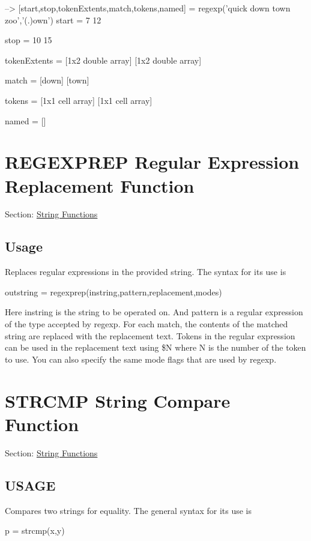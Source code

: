 \begin{DoxyVerbInclude}
--> [start,stop,tokenExtents,match,tokens,named] = regexp('quick down town zoo','(.)own')
start = 
  7 12 

stop = 
 10 15 

tokenExtents = 
 [1x2 double array] [1x2 double array] 

match = 
 [down] [town] 

tokens = 
 [1x1 cell array] [1x1 cell array] 

named = 
  []
\end{DoxyVerbInclude}
 \hypertarget{string_regexprep}{}\section{R\-E\-G\-E\-X\-P\-R\-E\-P Regular Expression Replacement Function}\label{string_regexprep}
Section\-: \hyperlink{sec_string}{String Functions} \hypertarget{vtkwidgets_vtkxyplotwidget_Usage}{}\subsection{Usage}\label{vtkwidgets_vtkxyplotwidget_Usage}
Replaces regular expressions in the provided string. The syntax for its use is \begin{DoxyVerb}  outstring = regexprep(instring,pattern,replacement,modes)
\end{DoxyVerb}
 Here {\ttfamily instring} is the string to be operated on. And {\ttfamily pattern} is a regular expression of the type accepted by {\ttfamily regexp}. For each match, the contents of the matched string are replaced with the replacement text. Tokens in the regular expression can be used in the replacement text using {\ttfamily \$\-N} where {\ttfamily N} is the number of the token to use. You can also specify the same {\ttfamily mode} flags that are used by {\ttfamily regexp}. \hypertarget{string_strcmp}{}\section{S\-T\-R\-C\-M\-P String Compare Function}\label{string_strcmp}
Section\-: \hyperlink{sec_string}{String Functions} \hypertarget{typecast_dec2bin_USAGE}{}\subsection{U\-S\-A\-G\-E}\label{typecast_dec2bin_USAGE}
Compares two strings for equality. The general syntax for its use is \begin{DoxyVerb}  p = strcmp(x,y)
\end{DoxyVerb}
